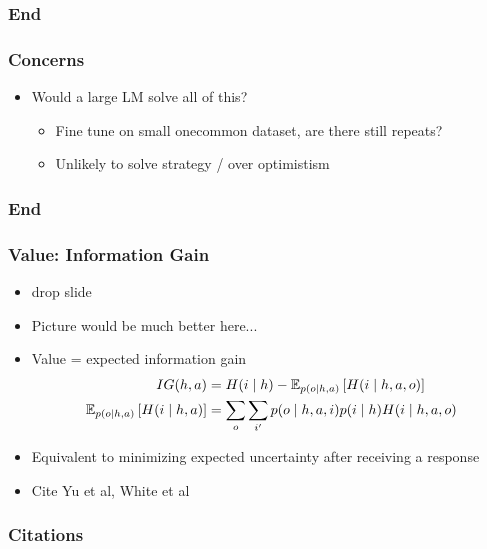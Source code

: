 \documentclass{beamer}
\begin{document}
\begin{frame}
\frametitle{End}
\end{frame}


\begin{frame}
\frametitle{Concerns}
\begin{itemize}
\item Would a large LM solve all of this?
    \begin{itemize}
    \item Fine tune on small onecommon dataset, are there still repeats?
    \item Unlikely to solve strategy / over optimistism
    \end{itemize}
\end{itemize}
\end{frame}

\begin{frame}
\frametitle{End}
\end{frame}


\begin{frame}
\frametitle{Value: Information Gain}
\begin{itemize}
\item drop slide
\item Picture would be much better here...
\item Value = expected information gain
\begin{align*}
IG(h, a) &= H(i \mid h) - \mathbb{E}_{p(o\mid h,a)}\left[H(i \mid h, a, o)\right]\\
\mathbb{E}_{p(o\mid h,a)}\left[H(i \mid h, a)\right] &= \sum_o\sum_{i'}p(o\mid h,a,i)p(i\mid h)H(i \mid h,a,o)
\end{align*}
\item Equivalent to minimizing expected uncertainty after receiving a response
\item Cite Yu et al, White et al
\end{itemize}
\end{frame}

\begin{frame}[allowframebreaks]
\frametitle{Citations}

\end{frame}
\end{document}
